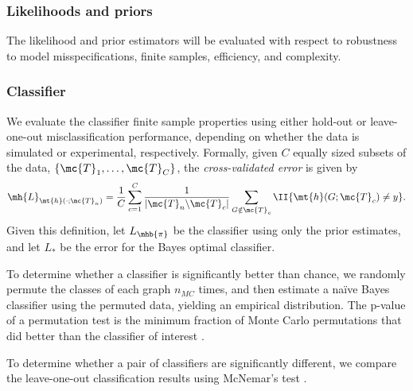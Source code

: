 \documentclass[10pt,journal,cspaper,compsoc]{IEEEtran}
\begin{document}
\subsubsection{Likelihoods and priors} %
\label{ssub:likelihoods_and_priors}

The likelihood and prior estimators will be evaluated with respect to robustness to model misspecifications, finite samples, efficiency, and complexity.




\subsubsection{Classifier} %
\label{ssub:classifier}

We evaluate the classifier finite sample properties using either hold-out or leave-one-out misclassification performance, depending on whether the data is simulated or experimental, respectively.  Formally, given $C$ equally sized subsets of the data, $\{\mc{T}_{1}, \ldots, \mc{T}_{C}\}$, the \emph{cross-validated error} is given by
\begin{align} \label{eq:L2}
	\mh{L}_{\mt{h}(\cdot; \mc{T}_n)} = \frac{1}{C}\sum_{c=1}^C \frac{1}{|\mc{T}_n \backslash \mc{T}_c|}\sum_{G \notin \mc{T}_c} \II\{\mt{h}(G; \mc{T}_{c}) \neq y\}.
\end{align}
Given this definition, let $L_{\mhb{\pi}}$ be the classifier using only the prior estimates, and let $L_*$ be the error for the Bayes optimal classifier.  

To determine whether a classifier is significantly better than chance, we randomly permute the classes of each graph $n_{MC}$ times, and then estimate a na\"ive Bayes classifier using the permuted data, yielding an empirical distribution.  The p-value of a permutation test is the minimum fraction of Monte Carlo permutations that did better than the classifier of interest \cite{Good2010}.  

To determine whether a pair of classifiers are significantly different, we compare the leave-one-out classification results using McNemar's test \cite{McNemar1947}.
\end{document}
